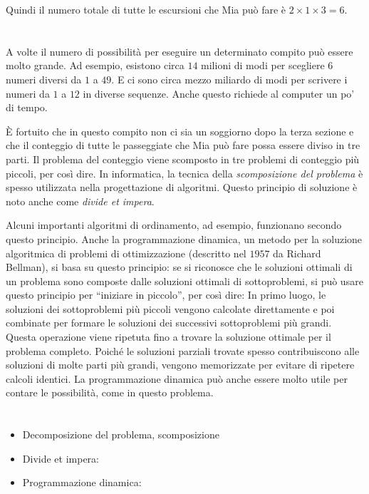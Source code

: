 {{Quindi il numero totale di tutte le escursioni che Mia può fare è ${2 \times 1 \times 3 = 6}$.



\section*{\BrochureItsInformatics}
A volte il numero di possibilità per eseguire un determinato compito può essere molto grande.  Ad esempio, esistono circa $14$ milioni di modi per scegliere $6$ numeri diversi da $1$ a $49$.  E ci sono circa mezzo miliardo di modi per scrivere i numeri da $1$ a $12$ in diverse sequenze.  Anche questo richiede al computer un po’ di tempo.

È fortuito che in questo compito non ci sia un soggiorno dopo la terza sezione e che il conteggio di tutte le passeggiate che Mia può fare possa essere diviso in tre parti.  Il problema del conteggio viene scomposto in tre problemi di conteggio più piccoli, per così dire.  In informatica, la tecnica della \emph{scomposizione del problema} è spesso utilizzata nella progettazione di algoritmi.  Questo principio di soluzione è noto anche come \emph{divide et impera}.

Alcuni importanti algoritmi di ordinamento, ad esempio, funzionano secondo questo principio.  Anche la programmazione dinamica, un metodo per la soluzione algoritmica di problemi di ottimizzazione (descritto nel $1957$ da Richard Bellman), si basa su questo principio: se si riconosce che le soluzioni ottimali di un problema sono composte dalle soluzioni ottimali di sottoproblemi, si può usare questo principio per \enquote{iniziare in piccolo}, per così dire:  In primo luogo, le soluzioni dei sottoproblemi più piccoli vengono calcolate direttamente e poi combinate per formare le soluzioni dei successivi sottoproblemi più grandi.  Questa operazione viene ripetuta fino a trovare la soluzione ottimale per il problema completo.  Poiché le soluzioni parziali trovate spesso contribuiscono alle soluzioni di molte parti più grandi, vengono memorizzate per evitare di ripetere calcoli identici.  La programmazione dinamica può anche essere molto utile per contare le possibilità, come in questo problema.



\section*{\BrochureWebsitesAndKeywords}
{\raggedright
\begin{itemize}
  \item Decomposizione del problema, scomposizione
  \item Divide et impera: \href{https://it.wikipedia.org/wiki/Divide_et_impera_(informatica)}{}
  \item Programmazione dinamica: \href{https://it.wikipedia.org/wiki/Programmazione_dinamica}{}
\end{itemize}


}}}
